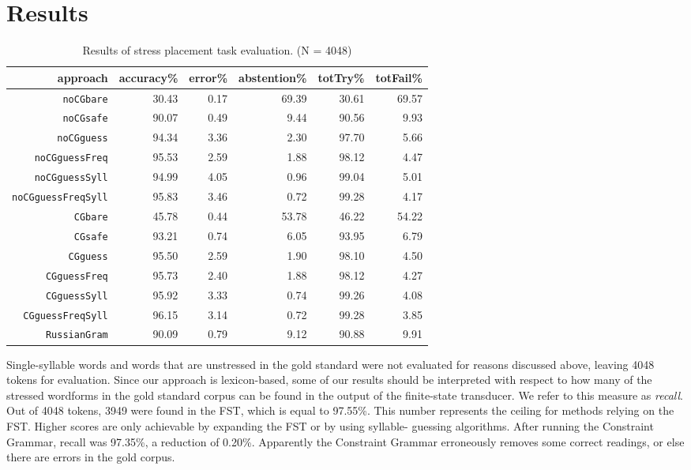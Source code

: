 \documentclass[11pt]{article}
\begin{document}
\section{Results}

\begin{table*}[t]
  \centering
  \begin{tabular}{r | r r r | r r }
    approach & accuracy\% & error\% & abstention\% & totTry\% & totFail\% \\
    \hline
    \hline
    {\small {\tt noCGbare}} & 30.43 & 0.17 & 69.39 & 30.61 & 69.57 \\
    {\small {\tt noCGsafe}} & 90.07 & 0.49 & 9.44 & 90.56 & 9.93 \\
    {\small {\tt noCGguess}} & 94.34 & 3.36 & 2.30 & 97.70 & 5.66 \\
    {\small {\tt noCGguessFreq}} & 95.53 & 2.59 & 1.88 & 98.12 & 4.47 \\
    {\small {\tt noCGguessSyll}} & 94.99 & 4.05 & 0.96 & 99.04 & 5.01 \\
    {\small {\tt noCGguessFreqSyll}} & 95.83 & 3.46 & 0.72 & 99.28 & 4.17 \\
    \hline
    {\small {\tt CGbare}} & 45.78 & 0.44 & 53.78 & 46.22 & 54.22 \\
    {\small {\tt CGsafe}} & 93.21 & 0.74 & 6.05 & 93.95 & 6.79 \\
    {\small {\tt CGguess}} & 95.50 & 2.59 & 1.90 & 98.10 & 4.50 \\
    {\small {\tt CGguessFreq}} & 95.73 & 2.40 & 1.88 & 98.12 & 4.27 \\
    {\small {\tt CGguessSyll}} & 95.92 & 3.33 & 0.74 & 99.26 & 4.08 \\
    {\small {\tt CGguessFreqSyll}} & 96.15 & 3.14 & 0.72 & 99.28 & 3.85 \\
    \hline
    {\small {\tt RussianGram}} & 90.09 & 0.79 & 9.12 & 90.88 & 9.91
  \end{tabular}
  \caption{Results of stress placement task evaluation. (N = 4048)}
  \label{tab:results}
\end{table*}

Single-syllable words and words that are unstressed in the gold standard were
not evaluated for reasons discussed above, leaving 4048 tokens for evaluation.
Since our approach is lexicon-based, some of our results should be interpreted
with respect to how many of the stressed wordforms in the gold standard corpus
can be found in the output of the finite-state transducer. We refer to this 
measure as \emph{recall}. Out of 4048 tokens, 3949 were 
found in the FST, which is equal to 97.55\%.
This number represents the ceiling for methods relying on the FST.
Higher scores are only achievable by expanding the FST or by using syllable-
guessing algorithms. After running the Constraint Grammar, recall was 97.35\%, 
a reduction of 0.20\%. Apparently the Constraint Grammar erroneously removes some 
correct readings, or else there are errors in the gold corpus.
\end{document}
